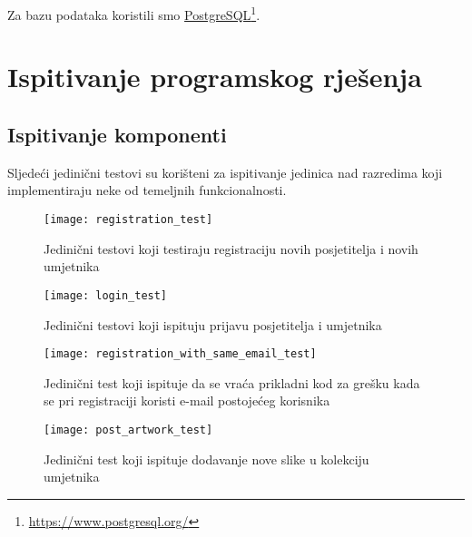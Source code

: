 {			Za bazu podataka koristili smo \underline{PostgreSQL}\footnote{\url{https://www.postgresql.org/}}.
			
			\eject 
		
	
		\section{Ispitivanje programskog rješenja}
			
			\subsection{Ispitivanje komponenti}

			{Sljedeći jedinični testovi su korišteni za ispitivanje jedinica nad razredima koji implementiraju neke od temeljnih funkcionalnosti.}
				\begin{figure}[H]
				
				\texttt{[image: registration\_test]}
				\caption{Jedinični testovi koji testiraju registraciju novih posjetitelja i novih umjetnika}
				
				\end{figure}
			
				\begin{figure}[H]
					
					\texttt{[image: login\_test]}
					\caption{Jedinični testovi koji ispituju prijavu posjetitelja i umjetnika}
					
				\end{figure}
			
				\begin{figure}[H]
				
				\texttt{[image: registration\_with\_same\_email\_test]}
				\caption{Jedinični test koji ispituje da se vraća prikladni kod za grešku kada se pri registraciji koristi e-mail postojećeg korisnika}
				
				\end{figure}
			
				\begin{figure}[H]
					
					\texttt{[image: post\_artwork\_test]}
					\caption{Jedinični test koji ispituje dodavanje nove slike u kolekciju umjetnika}
					
				\end{figure}
			
}
